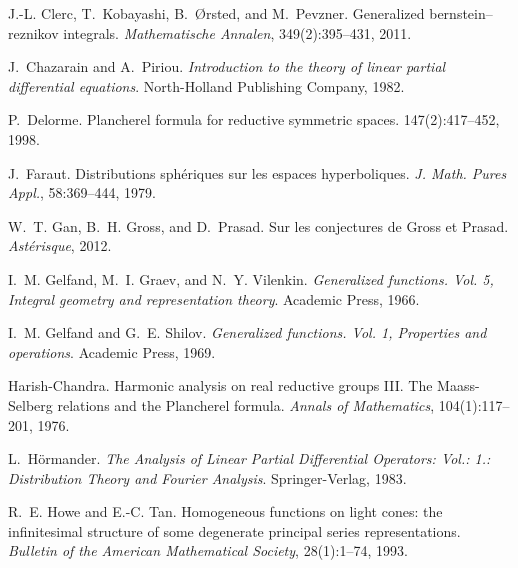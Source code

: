 \documentclass{article}
\newcommand{\tmtextit}[1]{{\itshape{#1}}}
\numberwithin{definition}{section}
\numberwithin{lemma}{section}
\numberwithin{proposition}{section}
{\theorembodyfont{\rmfamily}\newtheorem{remark}{Remark}
\numberwithin{remark}{section}
}
\begin{document}
\begin{thebibliography}{CK{\O}P11}
  J.-L. Clerc, T.~Kobayashi,
  B.~{\O}rsted, and M.~Pevzner. {\newblock}Generalized bernstein--reznikov
  integrals. {\newblock}\tmtextit{Mathematische Annalen}, 349(2):395--431,
  2011.
  
  J.~Chazarain and A.~Piriou.
  {\newblock}\tmtextit{Introduction to the theory of linear partial
  differential equations}. {\newblock}North-Holland Publishing Company, 1982.
  
  P.~Delorme. {\newblock}Plancherel
  formula for reductive symmetric spaces. {\newblock}147(2):417--452, 1998.
  
  J.~Faraut. {\newblock}Distributions
  sph{\'e}riques sur les espaces hyperboliques. {\newblock}\tmtextit{J. Math.
  Pures Appl.}, 58:369--444, 1979.
  
  W.~T. Gan, B.~H. Gross, and D.~Prasad.
  {\newblock}Sur les conjectures de Gross et Prasad.
  {\newblock}\tmtextit{Ast{\'e}risque}, 2012.
  
  I.~M. Gelfand, M.~I. Graev, and N.~Y.
  Vilenkin. {\newblock}\tmtextit{Generalized functions. Vol. 5, Integral
  geometry and representation theory}. {\newblock}Academic Press, 1966.
  
  I.~M. Gelfand and G.~E. Shilov.
  {\newblock}\tmtextit{Generalized functions. Vol. 1, Properties and
  operations}. {\newblock}Academic Press, 1969.
  
  Harish-Chandra. {\newblock}Harmonic
  analysis on real reductive groups III. The Maass-Selberg relations and the
  Plancherel formula. {\newblock}\tmtextit{Annals of Mathematics},
  104(1):117--201, 1976.
  
  L.~H{\"o}rmander.
  {\newblock}\tmtextit{The Analysis of Linear Partial Differential Operators:
  Vol.: 1.: Distribution Theory and Fourier Analysis}.
  {\newblock}Springer-Verlag, 1983.
  
  R.~E. Howe and E.-C. Tan.
  {\newblock}Homogeneous functions on light cones: the infinitesimal structure
  of some degenerate principal series representations.
  {\newblock}\tmtextit{Bulletin of the American Mathematical Society},
  28(1):1--74, 1993.
  

\end{thebibliography}
\end{document}
